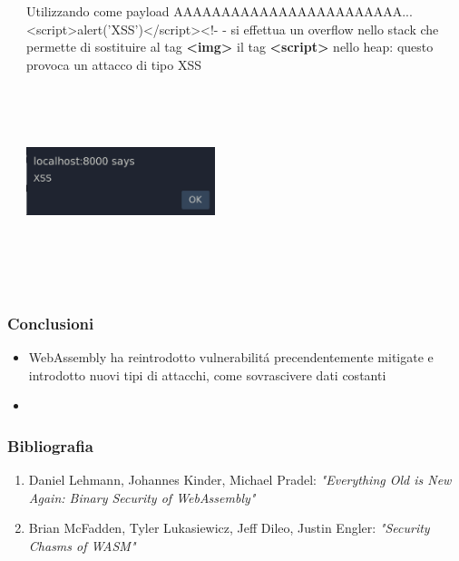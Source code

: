 \documentclass{beamer}
\begin{document}
\begin{frame}
\begin{columns}
\begin{column}{0.5\textwidth}
    \end{column}
    \begin{column}{0.5\textwidth}
      Utilizzando come payload
      \newline\newline\newline
      AAAAAAAAAAAAAAAAAAAAAAAA...
      <script>alert('XSS')</script><!- -
      \newline\newline\newline
      si effettua un overflow nello stack che permette di sostituire al tag
      \textbf{<img>} il tag \textbf{<script>} nello heap: questo provoca un attacco di
      tipo XSS
      \newline\newline\newline
      \centerline{\includegraphics[width=5.5cm,height=5.5cm,keepaspectratio]{images/xss.png}}
    \end{column}

  \end{columns}
\end{frame}


\begin{frame}
  \frametitle{Conclusioni}
  \begin{itemize}
    \item WebAssembly ha reintrodotto vulnerabilitá precendentemente mitigate
      e introdotto nuovi tipi di attacchi, come sovrascivere dati costanti
    \item  
  \end{itemize}
\end{frame}

\begin{frame}
  \frametitle{Bibliografia}
  \begin{enumerate}
    \item Daniel Lehmann, Johannes Kinder, Michael Pradel: \emph{"Everything Old is New Again:
      Binary Security of WebAssembly"}
    \item Brian McFadden, Tyler Lukasiewicz, Jeff Dileo, Justin Engler:
      \emph{"Security Chasms of WASM"}
  \end{enumerate}
\end{frame}
\end{document}
